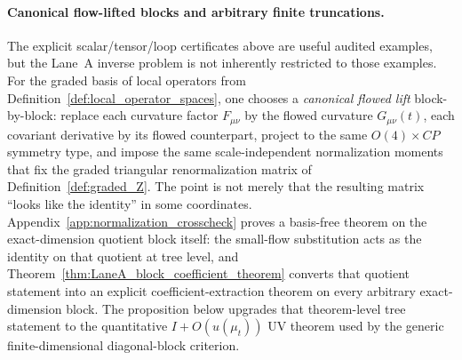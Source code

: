 \paragraph{Canonical flow-lifted blocks and arbitrary finite truncations.}
The explicit scalar/tensor/loop certificates above are useful audited examples, but the Lane~A inverse problem is not inherently restricted to those examples.
For the graded basis of local operators from Definition~\ref{def:local_operator_spaces}, one chooses a \emph{canonical flowed lift} block-by-block:
replace each curvature factor $F_{\mu\nu}$ by the flowed curvature $G_{\mu\nu}(t)$, each covariant derivative by its flowed counterpart,
project to the same $O(4)\times CP$ symmetry type, and impose the same scale-independent normalization moments that fix the graded triangular renormalization matrix of Definition~\ref{def:graded_Z}.
The point is not merely that the resulting matrix ``looks like the identity'' in some coordinates.
Appendix~\ref{app:normalization_crosscheck} proves a basis-free theorem on the exact-dimension quotient block itself:
the small-flow substitution acts as the identity on that quotient at tree level, and Theorem~\ref{thm:LaneA_block_coefficient_theorem} converts that quotient statement into an explicit coefficient-extraction theorem on every arbitrary exact-dimension block.
The proposition below upgrades that theorem-level tree statement to the quantitative $I+O(u(\mu_t))$ UV theorem used by the generic finite-dimensional diagonal-block criterion.

